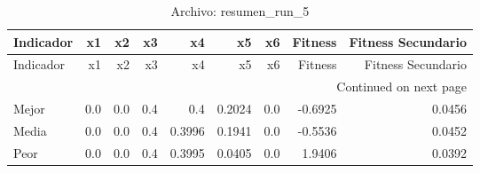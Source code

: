 \begin{longtable}{lrrrrrrrr}
\caption{Archivo: resumen\_run\_5}\label{tab:resumen_run_5} \\
\toprule
Indicador & x1 & x2 & x3 & x4 & x5 & x6 & Fitness & Fitness Secundario \\
\midrule
\endfirsthead
\toprule
Indicador & x1 & x2 & x3 & x4 & x5 & x6 & Fitness & Fitness Secundario \\
\midrule
\endhead
\midrule
\multicolumn{9}{r}{Continued on next page} \\
\midrule
\endfoot
\bottomrule
\endlastfoot
Mejor & 0.0 & 0.0 & 0.4 & 0.4 & 0.2024 & 0.0 & -0.6925 & 0.0456 \\
Media & 0.0 & 0.0 & 0.4 & 0.3996 & 0.1941 & 0.0 & -0.5536 & 0.0452 \\
Peor & 0.0 & 0.0 & 0.4 & 0.3995 & 0.0405 & 0.0 & 1.9406 & 0.0392 \\
\end{longtable}